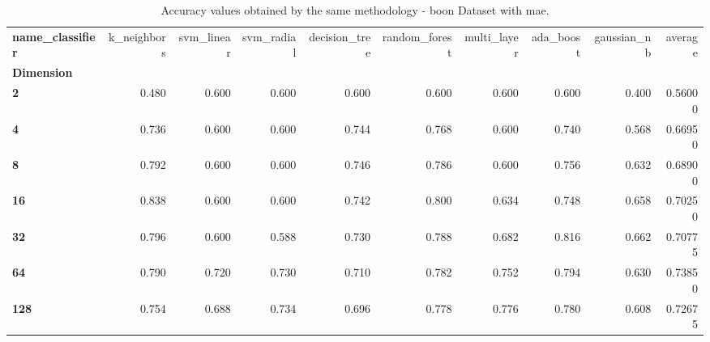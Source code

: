 \begin{table}
\centering
\caption{Accuracy values obtained by the same methodology - boon Dataset with mae.}
\label{accuracy_boon_mae-reproduction}
\begin{tabular}{lrrrrrrrrr}
\toprule
\textbf{name\_classifier} &  k\_neighbors &  svm\_linear &  svm\_radial &  decision\_tree &  random\_forest &  multi\_layer &  ada\_boost &  gaussian\_nb &  average \\
\textbf{Dimension} &              &             &             &                &                &              &            &              &          \\
\midrule
\textbf{2        } &        0.480 &       0.600 &       0.600 &          0.600 &          0.600 &        0.600 &      0.600 &        0.400 &  0.56000 \\
\textbf{4        } &        0.736 &       0.600 &       0.600 &          0.744 &          0.768 &        0.600 &      0.740 &        0.568 &  0.66950 \\
\textbf{8        } &        0.792 &       0.600 &       0.600 &          0.746 &          0.786 &        0.600 &      0.756 &        0.632 &  0.68900 \\
\textbf{16       } &        0.838 &       0.600 &       0.600 &          0.742 &          0.800 &        0.634 &      0.748 &        0.658 &  0.70250 \\
\textbf{32       } &        0.796 &       0.600 &       0.588 &          0.730 &          0.788 &        0.682 &      0.816 &        0.662 &  0.70775 \\
\textbf{64       } &        0.790 &       0.720 &       0.730 &          0.710 &          0.782 &        0.752 &      0.794 &        0.630 &  0.73850 \\
\textbf{128      } &        0.754 &       0.688 &       0.734 &          0.696 &          0.778 &        0.776 &      0.780 &        0.608 &  0.72675 \\
\bottomrule
\end{tabular}
\end{table}
